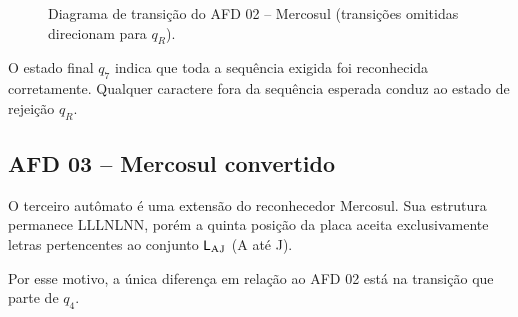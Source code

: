 \begin{figure}[ht]
\centering
{}
\caption{Diagrama de transição do AFD 02 -- Mercosul (transições omitidas direcionam para $q_R$).}
\label{fig:afd-mercosul}
\end{figure}

O estado final $q_7$ indica que toda a sequência exigida
foi reconhecida corretamente. Qualquer caractere fora
da sequência esperada conduz ao estado de rejeição $q_R$.

\subsection{AFD 03 -- Mercosul convertido}

O terceiro autômato é uma extensão do reconhecedor
Mercosul. Sua estrutura permanece LLLNLNN, porém a
quinta posição da placa aceita exclusivamente letras
pertencentes ao conjunto $\mathsf{L}_{\mathrm{AJ}}$ (A até J).

Por esse motivo, a única diferença em relação ao AFD 02
está na transição que parte de $q_4$.

